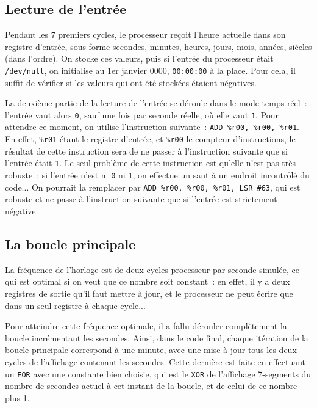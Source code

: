 \documentclass[11pt,a4paper]{article}
\begin{document}
\subsection{Lecture de l'entrée}

Pendant les 7 premiers cycles, le processeur reçoit l'heure actuelle
dans son registre d'entrée, sous forme secondes, minutes, heures,
jours, mois, années, siècles (dans l'ordre). On stocke ces valeurs,
puis si l'entrée du processeur était \verb!/dev/null!, on initialise au
1er janvier 0000, \verb!00:00:00! à la place. Pour cela, il suffit de
vérifier si les valeurs qui ont été stockées étaient négatives.

La deuxième partie de la lecture de l'entrée se déroule dans le mode
temps réel~: l'entrée vaut alors \verb!0!, sauf une fois par seconde
réelle, où elle vaut \verb!1!. Pour attendre ce moment, on utilise
l'instruction suivante~: \verb!ADD %r00, %r00, %r01!. En effet,
\verb!%r01! étant le registre d'entrée, et \verb!%r00! le compteur
d'instructions, le résultat de cette instruction sera de ne passer à
l'instruction suivante que si l'entrée était \verb!1!. Le seul
problème de cette instruction est qu'elle n'est pas très robuste~: si
l'entrée n'est ni \verb!0! ni \verb!1!, on effectue un saut à un
endroit incontrôlé du code... On pourrait la remplacer par
\verb!ADD %r00, %r00, %r01, LSR #63!, qui est robuste et ne passe à
l'instruction suivante que si l'entrée est strictement négative.

\subsection{La boucle principale}

La fréquence de l'horloge est de deux cycles processeur par seconde
simulée, ce qui est optimal si on veut que ce nombre soit constant~:
en effet, il y a deux registres de sortie qu'il faut mettre à jour, et
le processeur ne peut écrire que dans un seul registre à chaque cycle...

Pour atteindre cette fréquence optimale, il a fallu dérouler
complètement la boucle incrémentant les secondes. Ainsi, dans le code
final, chaque itération de la boucle principale correspond à une
minute, avec une mise à jour tous les deux cycles de l'affichage
contenant les secondes. Cette dernière est faite en effectuant un
\verb!EOR! avec une constante bien choisie, qui est le \verb!XOR! de
l'affichage 7-segments du nombre de secondes actuel à cet instant de
la boucle, et de celui de ce nombre plus 1.
\end{document}
